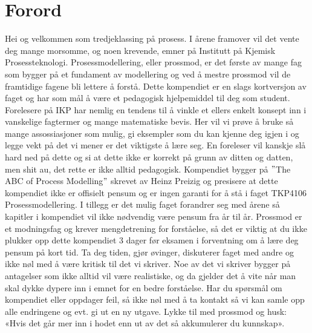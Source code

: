 \section{Forord}\label{sec:forord} 
Hei og velkommen som tredjeklassing på prosess. I årene framover vil det vente deg mange morsomme, og noen krevende, emner på Institutt på Kjemisk Prosessteknologi. Prosessmodellering, eller prossmod, er det første av mange fag som bygger på et fundament av modellering og ved å mestre prossmod vil de framtidige fagene bli lettere å forstå. Dette kompendiet er en slags kortversjon av faget og har som mål å være et pedagogisk hjelpemiddel til deg som student. Forelesere på IKP har nemlig en tendens til å vinkle et ellers enkelt konsept inn i vanskelige fagtermer og mange matematiske bevis. Her vil vi prøve å bruke så mange assossiasjoner som mulig, gi eksempler som du kan kjenne deg igjen i og legge vekt på det vi mener er det viktigste å lære seg. En foreleser vil kanskje slå hard ned på dette og si at dette ikke er korrekt på grunn av ditten og datten, men shit au, det rette er ikke alltid pedagogisk. Kompendiet bygger på $"$The ABC of Process Modelling$"$ skrevet av Heinz Preizig og presisere at dette kompendiet ikke er offisielt pensum og er ingen garanti for å stå i faget TKP4106 Prosessmodellering. I tillegg er det mulig faget forandrer seg med årene så kapitler i kompendiet vil ikke nødvendig være pensum fra år til år. Prossmod er et modningsfag og krever mengdetrening for forståelse, så det er viktig at du ikke plukker opp dette kompendiet 3 dager før eksamen i forventning om å lære deg pensum på kort tid. Ta deg tiden, gjør øvinger, diskuterer faget med andre og ikke nøl med å være kritisk til det vi skriver. Noe av det vi skriver bygger på antagelser som ikke alltid vil være realistiske, og da gjelder det å vite når man skal dykke dypere inn i emnet for en bedre forståelse. Har du spørsmål om kompendiet eller oppdager feil, så ikke nøl med å ta kontakt så vi kan samle opp alle endringene og evt. gi ut en ny utgave. Lykke til med prossmod og husk: «Hvis det går mer inn i hodet enn ut av det så akkumulerer du kunnskap». 

\clearpage
